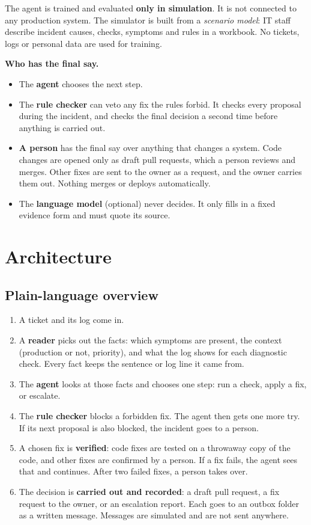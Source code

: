 \documentclass[11pt,a4paper]{article}
\begin{document}
The agent is trained and evaluated \textbf{only in simulation}. It is not connected to any
production system. The simulator is built from a \emph{scenario model}: IT staff describe
incident causes, checks, symptoms and rules in a workbook. No tickets, logs or personal data are
used for training.

\textbf{Who has the final say.}
\begin{itemize}
\item The \textbf{agent} chooses the next step.
\item The \textbf{rule checker} can veto any fix the rules forbid. It checks every proposal
  during the incident, and checks the final decision a second time before anything is carried out.
\item \textbf{A person} has the final say over anything that changes a system. Code changes are
  opened only as draft pull requests, which a person reviews and merges. Other fixes are sent to
  the owner as a request, and the owner carries them out. Nothing merges or deploys automatically.
\item The \textbf{language model} (optional) never decides. It only fills in a fixed evidence
  form and must quote its source.
\end{itemize}

\section{Architecture}

\subsection{Plain-language overview}

\begin{enumerate}
\item A ticket and its log come in.
\item A \textbf{reader} picks out the facts: which symptoms are present, the context (production
  or not, priority), and what the log shows for each diagnostic check. Every fact keeps the
  sentence or log line it came from.
\item The \textbf{agent} looks at those facts and chooses one step: run a check, apply a fix, or
  escalate.
\item The \textbf{rule checker} blocks a forbidden fix. The agent then gets one more try. If its
  next proposal is also blocked, the incident goes to a person.
\item A chosen fix is \textbf{verified}: code fixes are tested on a throwaway copy of the code,
  and other fixes are confirmed by a person. If a fix fails, the agent sees that and continues.
  After two failed fixes, a person takes over.
\item The decision is \textbf{carried out and recorded}: a draft pull request, a fix request to
  the owner, or an escalation report. Each goes to an outbox folder as a written message.
  Messages are simulated and are not sent anywhere.
\end{enumerate}
\end{document}
